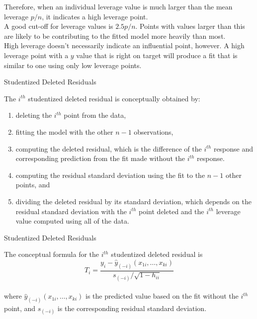 {{\vspace{0.5in}
Therefore, when an individual leverage value is much larger than the mean leverage $p/n$, it
indicates a high leverage point. \\
\vspace{0.5in}
A good cut-off for leverage values is $2.5p/n$.  Points with values larger than this are
likely to be contributing to the fitted model more heavily than most. \\
\vspace{0.5in}
High leverage doesn't necessarily indicate an influential point, however.  A high leverage
point with a $y$ value that is right on target will produce a fit that is similar to 
one using only low leverage points.
\newpage
\begin{center}
Studentized Deleted Residuals
\end{center}
\vspace{0.5in}
The $i^{th}$ studentized deleted residual is conceptually obtained by: 
\begin{enumerate}
\item deleting the $i^{th}$ point from the data,
\item fitting the model with the other $n-1$ observations,
\item computing the deleted residual, which is the difference of the
$i^{th}$ response and corresponding prediction from the fit made without the $i^{th}$
response.
\item computing the residual standard deviation using the
fit to the $n-1$ other points, and
\item dividing the deleted residual by its standard deviation, which
depends on the residual standard deviation with the $i^{th}$ point
deleted and the $i^{th}$ leverage value computed using all of the data. \\
\end{enumerate}
\newpage
\begin{center}
Studentized Deleted Residuals
\end{center}
\vspace{0.5in}
The conceptual formula for the $i^{th}$ studentized deleted residual is 
\vspace{0.15in}
\[  T_i = \frac{y_i-\hat{y}_{(-i)}(x_{1i},\ldots,x_{ki})}{s_{(-i)}/\sqrt{1-h_{ii}}} \] \\
\vspace{0.15in}
where $\hat{y}_{(-i)}(x_{1i},\ldots,x_{ki})$ is the predicted value based on the fit without
the $i^{th}$ point, and $s_{(-i)}$ is the corresponding residual standard deviation.  \\
}}
